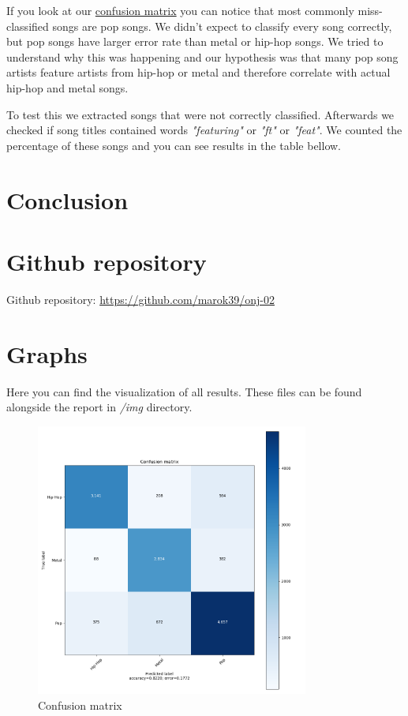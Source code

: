\documentclass[a4paper,11pt]{article}
\begin{document}
If you look at our \hyperref[label-cf-matrix]{confusion matrix} you can notice that most commonly miss-classified songs are pop songs. We didn't expect to classify every song correctly, but pop songs have larger error rate than metal or hip-hop songs. We tried to understand why this was happening and our hypothesis was that many pop song artists feature artists from hip-hop or metal and therefore correlate with actual hip-hop and metal songs.

To test this we extracted songs that were not correctly classified. Afterwards we checked if song titles contained words \textit{"featuring"} or \textit{"ft"} or \textit{"feat"}. We counted the percentage of these songs and you can see results in the table bellow.


\section{Conclusion}


\section{Github repository}
Github repository: \href{https://github.com/marok39/onj-02}{https://github.com/marok39/onj-02}

\pagebreak
\appendix
\appendixpage
\section{\label{label-graphs} Graphs}

Here you can find the visualization of all results. These files can be found alongside the report in \textit{/img} directory.

\begin{figure}[h]
\begin{center}
\includegraphics[width=0.8\textwidth]{./img/matrix.png}
\end{center}
\caption{Confusion matrix}
\label{label-cf-matrix}
\end{figure}
\end{document}
